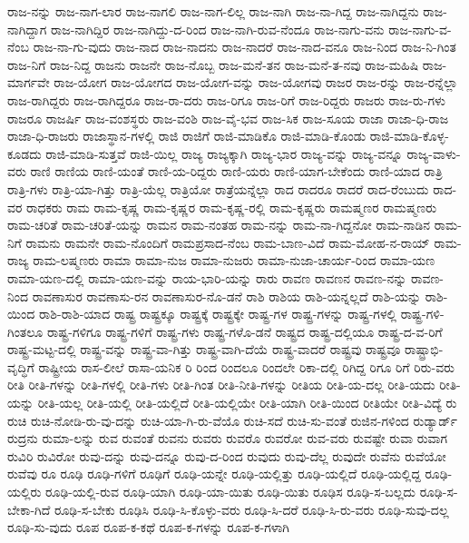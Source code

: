 {ರಾಜ-ನನ್ನು
ರಾಜ-ನಾಗ-ಲಾರ
ರಾಜ-ನಾಗಲಿ
ರಾಜ-ನಾಗ-ಲಿಲ್ಲ
ರಾಜ-ನಾಗಿ
ರಾಜ-ನಾ-ಗಿದ್ದ
ರಾಜ-ನಾಗಿದ್ದನು
ರಾಜ-ನಾಗಿದ್ದಾಗ
ರಾಜ-ನಾಗಿದ್ದಿರ
ರಾಜ-ನಾಗಿದ್ದು-ದ-ರಿಂದ
ರಾಜ-ನಾಗಿ-ರುವ-ನೆಂದೂ
ರಾಜ-ನಾಗು-ವನು
ರಾಜ-ನಾಗು-ವ-ನೆಂಬ
ರಾಜ-ನಾ-ಗು-ವುದು
ರಾಜ-ನಾದ
ರಾಜ-ನಾದನು
ರಾಜ-ನಾದರೆ
ರಾಜ-ನಾದ-ವನೂ
ರಾಜ-ನಿಂದ
ರಾಜ-ನಿ-ಗಿಂತ
ರಾಜ-ನಿಗೆ
ರಾಜ-ನಿದ್ದ
ರಾಜನು
ರಾಜನೇ
ರಾಜ-ನೊಬ್ಬ
ರಾಜ-ಮನೆ-ತನ
ರಾಜ-ಮನೆ-ತ-ನವು
ರಾಜ-ಮಹಿಷಿ
ರಾಜ-ಮಾರ್ಗವೇ
ರಾಜ-ಯೋಗ
ರಾಜ-ಯೋಗದ
ರಾಜ-ಯೋಗ-ವನ್ನು
ರಾಜ-ಯೋಗವು
ರಾಜರ
ರಾಜ-ರನ್ನು
ರಾಜ-ರನ್ನೆಲ್ಲಾ
ರಾಜ-ರಾಗಿದ್ದರು
ರಾಜ-ರಾಗಿದ್ದರೂ
ರಾಜ-ರಾ-ದರು
ರಾಜ-ರಿಗೂ
ರಾಜ-ರಿಗೆ
ರಾಜ-ರಿದ್ದರು
ರಾಜರು
ರಾಜ-ರು-ಗಳು
ರಾಜರೂ
ರಾಜರ್ಷಿ
ರಾಜ-ವಂಶಸ್ಥರು
ರಾಜ-ವಂಶಿ
ರಾಜ-ವೈ-ಭವ
ರಾಜ-ಸಿಕ
ರಾಜ-ಸೂಯ
ರಾಜಾ
ರಾಜಾ-ಧಿ-ರಾಜ
ರಾಜಾ-ಧಿ-ರಾಜರು
ರಾಜಾಸ್ಥಾನ-ಗಳಲ್ಲಿ
ರಾಜಿ
ರಾಜಿಗೆ
ರಾಜಿ-ಮಾಡಿಕೊ
ರಾಜಿ-ಮಾಡಿ-ಕೊಂಡು
ರಾಜಿ-ಮಾಡಿ-ಕೊಳ್ಳ-ಕೂಡದು
ರಾಜಿ-ಮಾಡಿ-ಸುತ್ತವೆ
ರಾಜಿ-ಯಿಲ್ಲ
ರಾಜ್ಯ
ರಾಜ್ಯಕ್ಕಾಗಿ
ರಾಜ್ಯ-ಭಾರ
ರಾಜ್ಯ-ವನ್ನು
ರಾಜ್ಯ-ವನ್ನೂ
ರಾಜ್ಯ-ವಾಳು-ವರು
ರಾಣಿ
ರಾಣಿಯ
ರಾಣಿ-ಯಂತೆ
ರಾಣಿ-ಯ-ರಿದ್ದರು
ರಾಣಿ-ಯರು
ರಾಣಿ-ಯಾಗ-ಬೇಕೆಂದು
ರಾಣಿ-ಯಾದ
ರಾತ್ರಿ
ರಾತ್ರಿ-ಗಳು
ರಾತ್ರಿ-ಯಾ-ಗಿತ್ತು
ರಾತ್ರಿ-ಯೆಲ್ಲ
ರಾತ್ರಿಯೋ
ರಾತ್ರೆಯನ್ನೆಲ್ಲಾ
ರಾದ
ರಾದರೂ
ರಾದರೆ
ರಾದ-ರೆಂಬುದು
ರಾದ-ವರ
ರಾಧಕರು
ರಾಮ
ರಾಮ-ಕೃಷ್ಣ
ರಾಮ-ಕೃಷ್ಣರ
ರಾಮ-ಕೃಷ್ಣ-ರಲ್ಲಿ
ರಾಮ-ಕೃಷ್ಣರು
ರಾಮಷ್ಮಣರ
ರಾಮಷ್ಮಣರು
ರಾಮ-ಚರಿತೆ
ರಾಮ-ಚರಿತೆ-ಯನ್ನು
ರಾಮನ
ರಾಮ-ನಂತಹ
ರಾಮ-ನನ್ನು
ರಾಮ-ನಾ-ಗಿದ್ದನೋ
ರಾಮ-ನಾಡಿನ
ರಾಮ-ನಿಗೆ
ರಾಮನು
ರಾಮನೇ
ರಾಮ-ನೊಂದಿಗೆ
ರಾಮಪ್ರಸಾದ-ನೆಂಬ
ರಾಮ-ಬಾಣ-ವಿದೆ
ರಾಮ-ಮೋಹ-ನ-ರಾಯ್
ರಾಮ-ರಾಜ್ಯ
ರಾಮ-ಲಷ್ಮಣರು
ರಾಮಾ
ರಾಮಾ-ನುಜ
ರಾಮಾ-ನುಜರು
ರಾಮಾ-ನುಜಾ-ಚಾರ್ಯ-ರಿಂದ
ರಾಮಾ-ಯಣ
ರಾಮಾ-ಯಣ-ದಲ್ಲಿ
ರಾಮಾ-ಯಣ-ವನ್ನು
ರಾಯ-ಭಾರಿ-ಯನ್ನು
ರಾರು
ರಾವಣ
ರಾವಣನ
ರಾವಣ-ನನ್ನು
ರಾವಣ-ನಿಂದ
ರಾವಣಾಸುರ
ರಾವಣಾಸು-ರನ
ರಾವಣಾಸುರ-ನೊ-ಡನೆ
ರಾಶಿ
ರಾಶಿಯ
ರಾಶಿ-ಯನ್ನಲ್ಲದೆ
ರಾಶಿ-ಯನ್ನು
ರಾಶಿ-ಯಿಂದ
ರಾಶಿ-ರಾಶಿ-ಯಾದ
ರಾಷ್ಟ್ರ
ರಾಷ್ಟ್ರಕ್ಕೂ
ರಾಷ್ಟ್ರಕ್ಕೆ
ರಾಷ್ಟ್ರಕ್ಕೇ
ರಾಷ್ಟ್ರ-ಗಳ
ರಾಷ್ಟ್ರ-ಗಳನ್ನು
ರಾಷ್ಟ್ರ-ಗಳಲ್ಲಿ
ರಾಷ್ಟ್ರ-ಗಳಿ-ಗಿಂತಲೂ
ರಾಷ್ಟ್ರ-ಗಳಿಗೂ
ರಾಷ್ಟ್ರ-ಗಳಿಗೆ
ರಾಷ್ಟ್ರ-ಗಳು
ರಾಷ್ಟ್ರ-ಗಳೊ-ಡನೆ
ರಾಷ್ಟ್ರದ
ರಾಷ್ಟ್ರ-ದಲ್ಲಿಯೂ
ರಾಷ್ಟ್ರ-ದ-ವ-ರಿಗೆ
ರಾಷ್ಟ್ರ-ಮಟ್ಟ-ದಲ್ಲಿ
ರಾಷ್ಟ್ರ-ವನ್ನು
ರಾಷ್ಟ್ರ-ವಾ-ಗಿತ್ತು
ರಾಷ್ಟ್ರ-ವಾಗಿ-ದೆಯೆ
ರಾಷ್ಟ್ರ-ವಾದರೆ
ರಾಷ್ಟ್ರವು
ರಾಷ್ಟ್ರವೂ
ರಾಷ್ಟ್ರಾಭಿ-ವೃದ್ಧಿಗೆ
ರಾಷ್ಟ್ರೀಯ
ರಾಸ-ಲೀಲೆ
ರಾಸಾ-ಯನಿಕ
ರಿ
ರಿಂದ
ರಿಂದಲೂ
ರಿಂದಲೇ
ರಿಕಾ-ದಲ್ಲಿ
ರಿಗಿದ್ದ
ರಿಗೂ
ರಿಗೆ
ರಿರು-ವರು
ರೀತಿ
ರೀತಿ-ಗಳನ್ನು
ರೀತಿ-ಗಳಲ್ಲಿ
ರೀತಿ-ಗಳು
ರೀತಿ-ಗಿಂತ
ರೀತಿ-ನೀತಿ-ಗಳನ್ನು
ರೀತಿಯ
ರೀತಿ-ಯ-ದಲ್ಲ
ರೀತಿ-ಯದು
ರೀತಿ-ಯನ್ನು
ರೀತಿ-ಯಲ್ಲ
ರೀತಿ-ಯಲ್ಲಿ
ರೀತಿ-ಯಲ್ಲಿದೆ
ರೀತಿ-ಯಲ್ಲಿಯೇ
ರೀತಿ-ಯಾಗಿ
ರೀತಿ-ಯಿಂದ
ರೀತಿಯೇ
ರೀತಿ-ವಿದ್ಯೆ
ರು
ರುಚಿ
ರುಚಿ-ನೋಡಿ-ರು-ವು-ದನ್ನು
ರುಚಿ-ಯಾ-ಗಿ-ರು-ವೆಯೊ
ರುಚಿ-ಸದೆ
ರುಚಿ-ಸು-ವಂತೆ
ರುಜಿನ-ಗಳಿಂದ
ರುಡ್ಯಾರ್ಡ್
ರುದ್ರನು
ರುಮಾ-ಲನ್ನು
ರುವ
ರುವಂತೆ
ರುವನು
ರುವರು
ರುವರೊ
ರುವರೋ
ರುವ-ವರು
ರುವಷ್ಟೇ
ರುವಾ
ರುವಾಗ
ರುವಿರಿ
ರುವಿರೋ
ರುವು-ದನ್ನು
ರುವು-ದನ್ನೂ
ರುವು-ದ-ರಿಂದ
ರುವುದು
ರುವು-ದೆಲ್ಲ
ರುವುದೇ
ರುವೆನು
ರುವೆಯೋ
ರುವೆವು
ರೂ
ರೂಢಿ
ರೂಢಿ-ಗಳಿಗೆ
ರೂಢಿಗೆ
ರೂಢಿ-ಯನ್ನೇ
ರೂಢಿ-ಯಲ್ಲಿತ್ತು
ರೂಢಿ-ಯಲ್ಲಿದೆ
ರೂಢಿ-ಯಲ್ಲಿದ್ದ
ರೂಢಿ-ಯಲ್ಲಿರು
ರೂಢಿ-ಯಲ್ಲಿ-ರುವ
ರೂಢಿ-ಯಾಗಿ
ರೂಢಿ-ಯಾ-ಯಿತು
ರೂಢಿ-ಯಿತು
ರೂಢಿಸ
ರೂಢಿ-ಸ-ಬಲ್ಲದು
ರೂಢಿ-ಸ-ಬೇಕಾ-ಗಿದೆ
ರೂಢಿ-ಸ-ಬೇಕು
ರೂಢಿಸಿ
ರೂಢಿ-ಸಿ-ಕೊಳ್ಳು-ವರು
ರೂಢಿ-ಸಿ-ದರೆ
ರೂಢಿ-ಸಿ-ರು-ವರು
ರೂಢಿ-ಸುವು-ದಲ್ಲ
ರೂಢಿ-ಸು-ವುದು
ರೂಪ
ರೂಪ-ಕ-ಕಥೆ
ರೂಪ-ಕ-ಗಳನ್ನು
ರೂಪ-ಕ-ಗಳಾಗಿ
}
